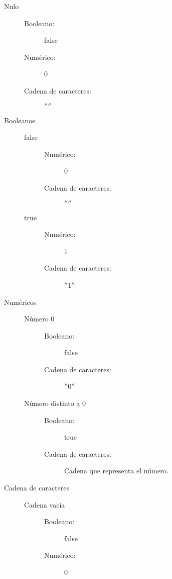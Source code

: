 \begin{description}
\item [Nulo] \hfill
   \begin{description}
   \item[Booleano:] false
   \item[Numérico:] 0
   \item[Cadena de caracteres:] $''$$''$
   \end{description}
\item[Booleanos] \hfill
   \begin{description}
   \item[false] \hfill
      \begin{description}
      \item[Numérico:] 0 
      \item[Cadena de caracteres:] $''$$''$
      \end{description}
   \item[true] \hfill
      \begin{description}
      \item[Numérico:] 1 
      \item[Cadena de caracteres:] $''$1$''$
      \end{description}
   \end{description}
\item[Numéricos] \hfill
   \begin{description}
   \item[Número 0] \hfill
      \begin{description}
      \item[Booleano:] false 
      \item[Cadena de caracteres:] $''$0$''$
      \end{description}
   \item[Número distinto a 0] \hfill
      \begin{description}
      \item[Booleano:] true 
      \item[Cadena de caracteres:] Cadena que representa el número.
      \end{description}
   \end{description}
\item[Cadena de caracteres] \hfill
   \begin{description}
   \item[Cadena vacía] \hfill
      \begin{description}
      \item[Booleano:] false 
      \item[Numérico:] 0

\end{description}
\end{description}
\end{description}
